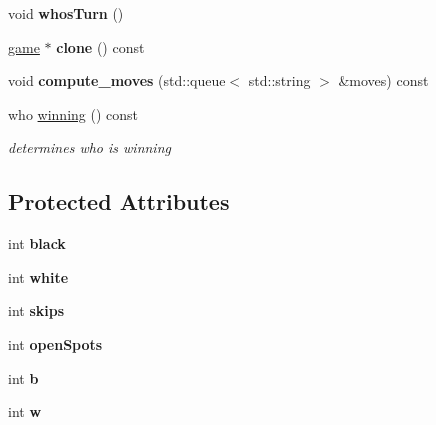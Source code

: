 \begin{DoxyCompactItemize}
\item 
void {\bfseries whos\+Turn} ()\hypertarget{classmain__savitch__14_1_1Othello_a21440dbb4511812a76c578a5f546710b}{}\label{classmain__savitch__14_1_1Othello_a21440dbb4511812a76c578a5f546710b}

\item 
\hyperlink{classmain__savitch__14_1_1game}{game} $\ast$ {\bfseries clone} () const \hypertarget{classmain__savitch__14_1_1Othello_ab5a505f8a6ffd860376bf074c57e8a5f}{}\label{classmain__savitch__14_1_1Othello_ab5a505f8a6ffd860376bf074c57e8a5f}

\item 
void {\bfseries compute\+\_\+moves} (std\+::queue$<$ std\+::string $>$ \&moves) const \hypertarget{classmain__savitch__14_1_1Othello_aae15562565348c574b8e4c0b7782d19f}{}\label{classmain__savitch__14_1_1Othello_aae15562565348c574b8e4c0b7782d19f}

\item 
who \hyperlink{classmain__savitch__14_1_1Othello_a8934d1b63f73c03dae9629dbe03955d7}{winning} () const 
\begin{DoxyCompactList}\small\item\em determines who is winning \end{DoxyCompactList}\end{DoxyCompactItemize}
\subsection*{Protected Attributes}
\begin{DoxyCompactItemize}
\item 
int {\bfseries black}\hypertarget{classmain__savitch__14_1_1Othello_a2eed818925f68d5678b78107a3298138}{}\label{classmain__savitch__14_1_1Othello_a2eed818925f68d5678b78107a3298138}

\item 
int {\bfseries white}\hypertarget{classmain__savitch__14_1_1Othello_a7d5f59b1e581ed7a8145debeecf4f310}{}\label{classmain__savitch__14_1_1Othello_a7d5f59b1e581ed7a8145debeecf4f310}

\item 
int {\bfseries skips}\hypertarget{classmain__savitch__14_1_1Othello_a85d4ce17512d8dbf85a313a27eea0644}{}\label{classmain__savitch__14_1_1Othello_a85d4ce17512d8dbf85a313a27eea0644}

\item 
int {\bfseries open\+Spots}\hypertarget{classmain__savitch__14_1_1Othello_a15045e3e94c34afe08240885e230d502}{}\label{classmain__savitch__14_1_1Othello_a15045e3e94c34afe08240885e230d502}

\item 
int {\bfseries b}\hypertarget{classmain__savitch__14_1_1Othello_a98fbc46241d2f5e05ccb4b66f11535bf}{}\label{classmain__savitch__14_1_1Othello_a98fbc46241d2f5e05ccb4b66f11535bf}

\item 
int {\bfseries w}\hypertarget{classmain__savitch__14_1_1Othello_a1b11c5fe33e30a94ed39e8cb55caf37e}{}\label{classmain__savitch__14_1_1Othello_a1b11c5fe33e30a94ed39e8cb55caf37e}

\end{DoxyCompactItemize}
